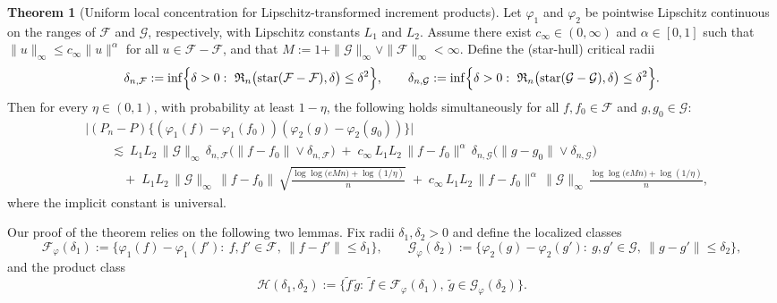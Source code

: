 \documentclass[11pt]{article}
\theoremstyle{plain}
\theoremstyle{definition} %
\newtheorem{theorem}{Theorem}
\begin{document}
\begin{theorem}[Uniform local concentration for Lipschitz-transformed increment products]
\label{lem:uniform_local_conc_lipschitz_product_increments_pointwise}
Let $\varphi_1$ and $\varphi_2$ be pointwise Lipschitz continuous on the ranges of
$\mathcal F$ and $\mathcal G$, respectively, with Lipschitz constants $L_1$ and $L_2$.
Assume there exist $c_\infty\in(0,\infty)$ and $\alpha\in[0,1]$ such that
$\|u\|_\infty\le c_\infty\|u\|^\alpha$ for all $u\in\mathcal F-\mathcal F$, and that
$M:=1+\|\mathcal G\|_\infty\vee \|\mathcal F\|_\infty<\infty$. Define the (star-hull) critical radii
\[
\delta_{n,\mathcal F}
:=
\inf\Bigl\{\delta>0:\ 
\mathfrak R_n\bigl(\mathrm{star}(\mathcal F-\mathcal F),\delta\bigr)\le \delta^2
\Bigr\},
\qquad
\delta_{n,\mathcal G}
:=
\inf\Bigl\{\delta>0:\ 
\mathfrak R_n\bigl(\mathrm{star}(\mathcal G-\mathcal G),\delta\bigr)\le \delta^2
\Bigr\}.
\]
Then for every $\eta\in(0,1)$, with probability at least $1-\eta$, the following holds
simultaneously for all $f,f_0\in\mathcal F$ and $g,g_0\in\mathcal G$:
\begin{align*}
&\bigl|(P_n-P)\{(\varphi_1(f)-\varphi_1(f_0))(\varphi_2(g)-\varphi_2(g_0))\}\bigr|\\
&\qquad \lesssim\ 
L_1L_2\,\|\mathcal G\|_\infty \,
\delta_{n,\mathcal F}\bigl(\|f-f_0\|\vee \delta_{n,\mathcal F}\bigr)
\;+\;
c_\infty\,L_1L_2\,\|f-f_0\|^{\alpha}\,
\delta_{n,\mathcal G}\bigl(\|g-g_0\|\vee \delta_{n,\mathcal G}\bigr)\\
&\qquad\quad +\;
L_1L_2\,\|\mathcal G\|_\infty \, \|f-f_0\|\,
\sqrt{\frac{\log\log\bigl(eMn\bigr)+\log(1/\eta)}{n}}
\;+\;
c_\infty\,L_1L_2\,\|f-f_0\|^{\alpha}\,\|\mathcal G\|_\infty\,
\frac{\log\log\bigl(eMn\bigr)+\log(1/\eta)}{n},
\end{align*}
where the implicit constant is universal.
\end{theorem}

 


 
 



 

Our proof of the theorem relies on the following two lemmas.
Fix radii $\delta_1,\delta_2>0$ and define the localized classes
\[
\mathcal F_{\varphi}(\delta_1)
:=
\{\varphi_1(f)-\varphi_1(f'):\ f,f'\in\mathcal F,\ \|f-f'\|\le \delta_1\},
\qquad
\mathcal G_{\varphi}(\delta_2)
:=
\{\varphi_2(g)-\varphi_2(g'):\ g,g'\in\mathcal G,\ \|g-g'\|\le \delta_2\},
\]
and the product class
\[
\mathcal H(\delta_1,\delta_2)
:=
\{\tilde f\,\tilde g:\ \tilde f\in \mathcal F_{\varphi}(\delta_1),\ \tilde g\in \mathcal G_{\varphi}(\delta_2)\}.
\]
\end{document}
